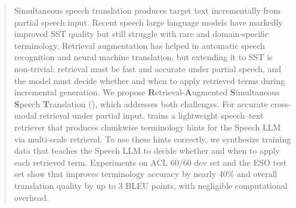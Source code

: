 
\begin{abstract}

Simultaneous speech translation produces target text incrementally from partial speech input.
Recent speech large language models have markedly improved SST quality but still struggle with rare and domain-specific terminology. Retrieval augmentation has helped in automatic speech recognition and neural machine translation, but extending it to SST is non-trivial: retrieval must be fast and accurate under partial speech, and the model must decide whether and when to apply retrieved terms during incremental generation.
We propose \textbf{R}etrieval-\textbf{A}ugmented \textbf{S}imultaneous \textbf{S}peech \textbf{T}ranslation (\method), which addresses both challenges. 
For accurate cross-modal retrieval under partial input, \method trains a lightweight speech–text retriever that produces chunkwise terminology hints for the Speech LLM via multi-scale retrieval. To use these hints correctly, we synthesize training data that teaches the Speech LLM to decide whether and when to apply each retrieved term. Experiments on ACL 60/60 dev set and the ESO test set show that \method improves terminology accuracy by nearly 40\% and overall translation quality by up to 3 BLEU points, with negligible computational overhead.

\end{abstract}